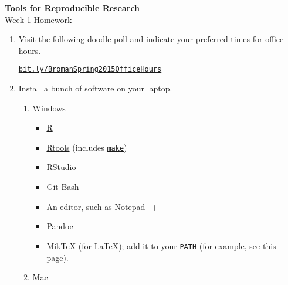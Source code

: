 \documentclass[12pt]{article}
\newcommand{\ttsm}{\tt \small}
\begin{document}
\thispagestyle{empty}

\textbf{Tools for Reproducible Research} \\
Week 1 Homework

\bigskip

\begin{enumerate}
\item Visit the following doodle poll and indicate your preferred
  times for office hours.

  \href{http://doodle.com/rrw8skdzadnymide}{\ttsm bit.ly/BromanSpring2015OfficeHours}

\item Install a bunch of software on your laptop.

  \begin{enumerate}
  \item Windows

    \begin{itemize}
    \item \href{http://cran.rstudio.com/bin/windows/base/}{R}
    \item \href{http://cran.rstudio.com/bin/windows/Rtools/Rtools32.exe}{Rtools}
      (includes \href{http://www.gnu.org/software/make/}{\ttsm make})
    \item \href{http://www.rstudio.com/products/rstudio/download/}{RStudio}
    \item \href{http://msysgit.github.io/}{Git Bash}
    \item An editor, such as \href{http://notepad-plus-plus.org/download}{Notepad++}
    \item \href{http://johnmacfarlane.net/pandoc/installing.html}{Pandoc}
    \item \href{http://miktex.org/download}{MikTeX} (for LaTeX); add
      it to your {\ttsm PATH} (for example, see
      \href{http://www.howtogeek.com/118594/how-to-edit-your-system-path-for-easy-command-line-access/}{this page}).
    \end{itemize}


  \item Mac


\end{enumerate}
\end{enumerate}
\end{document}
